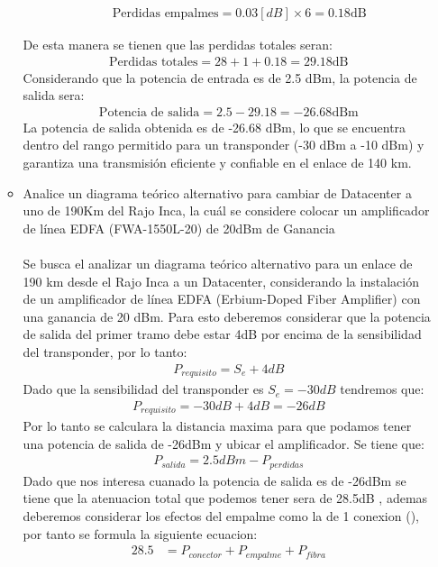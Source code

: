 \begin{enumerate}
\begin{itemize}
\begin{itemize}
\begin{align}
				\text{Perdidas empalmes} = 0.03 [dB] \times 6  = 0.18 \text{dB}
			\end{align}
		\end{itemize}
		De esta manera se tienen que las perdidas totales seran:
		\begin{align}
			\text{Perdidas totales} = 28 + 1 + 0.18 = 29.18 \text{dB}
		\end{align}
		Considerando que la potencia de entrada es de 2.5 dBm, la potencia de salida sera:
		\begin{align}
			\text{Potencia de salida} = 2.5 - 29.18 = -26.68 \text{dBm}
		\end{align}
		La potencia de salida obtenida es de -26.68 dBm, lo que se encuentra dentro del rango permitido para un transponder (-30 dBm a -10 dBm) y garantiza una transmisión eficiente y confiable en el enlace de 140 km.
		\item Analice un diagrama teórico alternativo para cambiar de Datacenter a uno de 190Km del Rajo Inca, la cuál se considere colocar un amplificador de línea EDFA (FWA-1550L-20) de 20dBm de Ganancia\\\\
		Se busca el analizar un diagrama teórico alternativo para un enlace de 190 km desde el Rajo Inca a un Datacenter, considerando la instalación de un amplificador de línea EDFA (Erbium-Doped Fiber Amplifier) con una ganancia de 20 dBm. Para esto deberemos considerar que la potencia de salida del primer tramo debe estar 4dB por encima de la sensibilidad del transponder, por lo tanto:
		\begin{align}
			P_{requisito} = S_{e} + 4dB
		\end{align}
		Dado que la sensibilidad del transponder es $S_{e}= -30dB$ tendremos que:
		\begin{align}
			P_{requisito} = -30dB + 4dB = -26dB
		\end{align}
		Por lo tanto se calculara la distancia maxima para que podamos tener una potencia de salida de -26dBm y ubicar el amplificador. Se tiene que:
		\begin{align}
			P_{salida} = 2.5dBm - P_{perdidas}
		\end{align}
		Dado que nos interesa cuanado la potencia de salida es de -26dBm se tiene que la atenuacion total que podemos tener sera de 28.5dB , ademas deberemos considerar los efectos del empalme como la de 1 conexion (), por tanto se formula la siguiente ecuacion:
		\begin{align}
			28.5 &= P_{conector} + P_{empalme} + P_{fibra}\\

\end{align}
\end{itemize}
\end{enumerate}
